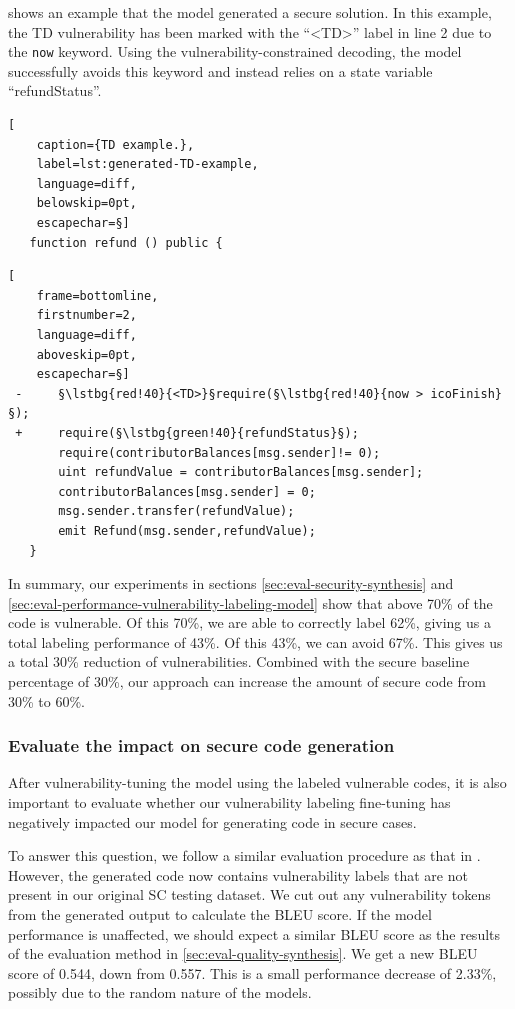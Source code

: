\documentclass[12pt]{book}
\newcommand{\lstbg}[3][0pt]{{\fboxsep#1\colorbox{#2}{\strut #3}}}
\begin{document}
 shows an example that the model generated a secure solution. In this example, the TD vulnerability has been marked with the ``\textless TD\textgreater'' label in line 2 due to the \lstinline{now} keyword. Using the vulnerability-constrained decoding, the model successfully avoids this keyword and instead relies on a state variable ``refundStatus''.

\begin{lstlisting}[
    caption={TD example.},
    label=lst:generated-TD-example,
    language=diff,
    belowskip=0pt,
    escapechar=§]
   function refund () public {
\end{lstlisting}
\begin{lstlisting}[
    frame=bottomline,
    firstnumber=2,
    language=diff,
    aboveskip=0pt,
    escapechar=§]
 -     §\lstbg{red!40}{<TD>}§require(§\lstbg{red!40}{now > icoFinish}§);
 +     require(§\lstbg{green!40}{refundStatus}§);
       require(contributorBalances[msg.sender]!= 0);
       uint refundValue = contributorBalances[msg.sender];
       contributorBalances[msg.sender] = 0;
       msg.sender.transfer(refundValue);
       emit Refund(msg.sender,refundValue);
   }
\end{lstlisting}


In summary, our experiments in sections \ref{sec:eval-security-synthesis} and \ref{sec:eval-performance-vulnerability-labeling-model} show that above 70\% of the code is vulnerable. Of this 70\%, we are able to correctly label 62\%, giving us a total labeling performance of 43\%. Of this 43\%, we can avoid 67\%. This gives us a total 30\% reduction of vulnerabilities. Combined with the secure baseline percentage of 30\%, our approach can increase the amount of secure code from 30\% to 60\%.

\subsubsection{Evaluate the impact on secure code generation} After vulnerability-tuning the model using the labeled vulnerable codes, it is also important to evaluate whether our vulnerability labeling fine-tuning has negatively impacted our model for generating code in secure cases. 

To answer this question, we follow a similar evaluation procedure as that in . However, the generated code now contains vulnerability labels that are not present in our original SC testing dataset. We cut out any vulnerability tokens from the generated output to calculate the BLEU score. If the model performance is unaffected, we should expect a similar BLEU score as the results of the evaluation method in \cref{sec:eval-quality-synthesis}. We get a new BLEU score of 0.544, down from 0.557. This is a small performance decrease of 2.33\%, possibly due to the random nature of the models.
\end{document}
